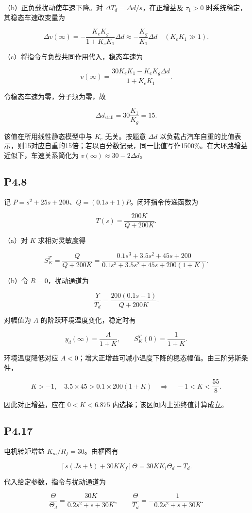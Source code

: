 \documentclass[UTF8,12pt]{ctexart}
\begin{document}
（b）正负载扰动使车速下降。对 $\Delta T_d=\Delta d/s$，在正增益及 $\tau_1>0$ 时系统稳定，其稳态车速改变量为

\[
\boxed{\Delta v(\infty)=-\frac{K_eK_g}{1+K_eK_1}\Delta d\approx-\frac{K_g}{K_1}\Delta d\quad(K_eK_1\gg1)}.
\]

（c）将指令与负载共同作用代入，稳态车速为

\[
v(\infty)=\frac{30K_eK_1-K_eK_g\Delta d}{1+K_eK_1}.
\]

令稳态车速为零，分子须为零，故

\[
\boxed{\Delta d_{\mathrm{stall}}=30\frac{K_1}{K_g}=15}.
\]

该值在所用线性静态模型中与 $K_e$ 无关。按题意 $\Delta d$ 以负载占汽车自重的比值表示，则15对应自重的15倍；若以百分数记录，同一比值写作1500\%。在大环路增益近似下，车速关系简化为 $v(\infty)\approx30-2\Delta d$。


\subsection*{P4.8}
记 $P=s^2+25s+200$、$Q=(0.1s+1)P$。闭环指令传递函数为

\[
T(s)=\frac{200K}{Q+200K}.
\]

（a）对 $K$ 求相对灵敏度得

\[
\boxed{S_K^T=\frac{Q}{Q+200K}=\frac{0.1s^3+3.5s^2+45s+200}{0.1s^3+3.5s^2+45s+200(1+K)}}.
\]

（b）令 $R=0$，扰动通道为

\[
\boxed{\frac{Y}{T_d}=\frac{200(0.1s+1)}{Q+200K}}.
\]

对幅值为 $A$ 的阶跃环境温度变化，稳定时有

\[
\boxed{y_d(\infty)=\frac{A}{1+K}},\qquad S_K^T(0)=\frac1{1+K}.
\]

环境温度降低对应 $A<0$；增大正增益可减小温度下降的稳态幅值。由三阶劳斯条件，

\[
K>-1,\quad 3.5\times45>0.1\times200(1+K)\quad\Longrightarrow\quad-1<K<\frac{55}{8}.
\]

因此对正增益，应在 $0<K<6.875$ 内选择；该区间内上述终值计算成立。


\subsection*{P4.17}
电机转矩增益 $K_m/R_f=30$。由框图有

\[
[s(Js+b)+30KK_f]\Theta=30KK_i\Theta_d-T_d.
\]

代入给定参数，指令与扰动通道为

\[
\frac\Theta{\Theta_d}=\frac{30K}{0.2s^2+s+30K},\qquad\frac\Theta{T_d}=-\frac1{0.2s^2+s+30K}.
\]
\end{document}
